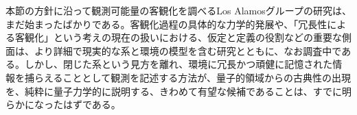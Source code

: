 \hypertarget{srcpage:88}{}\label{srcpage:88}
本節の方針に沿って観測可能量の客観化を調べるLos Alamosグループの研究は、まだ始まったばかりである。客観化過程の具体的な力学的発展\cite{ref111}や、「冗長性による客観化」という考えの現在の扱いにおける、仮定と定義の役割などの重要な側面は、より詳細で現実的な系と環境の模型を含む研究とともに、なお調査中である。しかし、閉じた系という見方を離れ、環境に冗長かつ頑健に記憶された情報を捕らえることとして観測を記述する方法が、量子的領域からの古典性の出現を、純粋に量子力学的に説明する、きわめて有望な候補であることは、すでに明らかになったはずである。
